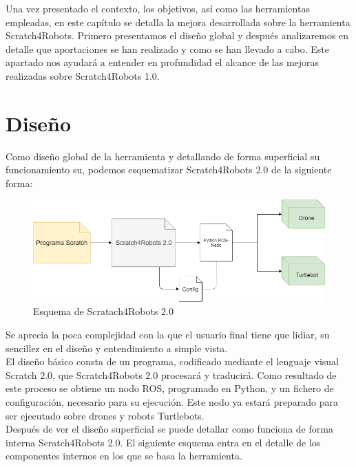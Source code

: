 Una vez presentado el contexto, los objetivos, así como las herramientas empleadas, en este capítulo se detalla la mejora desarrollada sobre la herramienta Scratch4Robots. Primero presentamos el diseño global y después analizaremos en detalle que aportaciones se han realizado y como se han llevado a cabo. Este apartado nos ayudará a entender en profundidad el alcance de las mejoras realizadas sobre Scratch4Robots 1.0.\\

\clearpage
\section{Diseño}
\label{sec:diseno}
Como diseño global de la herramienta y detallando de forma superficial su funcionamiento su, podemos esquematizar Scratch4Robots 2.0 de la siguiente forma:\\

\begin{figure}[H]
    \centering
    \includegraphics[scale=0.55]{img/esq-caja-negra.png}
  	\caption{Esquema de Scratach4Robots 2.0}
  	\label{fig:s4r-detalle}
\end{figure}

Se aprecia la poca complejidad con la que el usuario final tiene que lidiar, su sencillez en el diseño y entendimiento a simple vista.\\

El diseño básico consta de un programa, codificado mediante el lenguaje visual Scratch 2.0, que Scratch4Robots 2.0 procesará y traducirá. Como resultado de este proceso se obtiene un nodo ROS, programado en Python, y un fichero de configuración, necesario para su ejecución. Este nodo ya estará preparado para ser ejecutado sobre drones y robots Turtlebots.\\

Después de ver el diseño superficial se puede detallar como funciona de forma interna Scratch4Robots 2.0. El siguiente esquema entra en el detalle de los componentes internos en los que se basa la herramienta.\\


